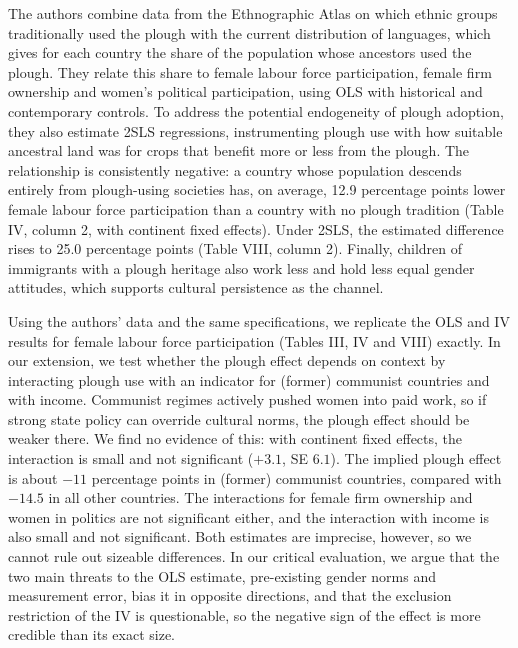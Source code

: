 \documentclass[12pt,a4paper]{article}
\begin{document}
The authors combine data from the Ethnographic Atlas on which ethnic groups traditionally used the plough with the current distribution of languages, which gives for each country the share of the population whose ancestors used the plough. They relate this share to female labour force participation, female firm ownership and women's political participation, using OLS with historical and contemporary controls. To address the potential endogeneity of plough adoption, they also estimate 2SLS regressions, instrumenting plough use with how suitable ancestral land was for crops that benefit more or less from the plough. The relationship is consistently negative: a country whose population descends entirely from plough-using societies has, on average, 12.9 percentage points lower female labour force participation than a country with no plough tradition (Table IV, column 2, with continent fixed effects). Under 2SLS, the estimated difference rises to 25.0 percentage points (Table VIII, column 2). Finally, children of immigrants with a plough heritage also work less and hold less equal gender attitudes, which supports cultural persistence as the channel.

Using the authors' data and the same specifications, we replicate the OLS and IV results for female labour force participation (Tables III, IV and VIII) exactly. In our extension, we test whether the plough effect depends on context by interacting plough use with an indicator for (former) communist countries and with income. Communist regimes actively pushed women into paid work, so if strong state policy can override cultural norms, the plough effect should be weaker there. We find no evidence of this: with continent fixed effects, the interaction is small and not significant ($+3.1$, SE $6.1$). The implied plough effect is about $-11$ percentage points in (former) communist countries, compared with $-14.5$ in all other countries. The interactions for female firm ownership and women in politics are not significant either, and the interaction with income is also small and not significant. Both estimates are imprecise, however, so we cannot rule out sizeable differences. In our critical evaluation, we argue that the two main threats to the OLS estimate, pre-existing gender norms and measurement error, bias it in opposite directions, and that the exclusion restriction of the IV is questionable, so the negative sign of the effect is more credible than its exact size.

\end{document}
